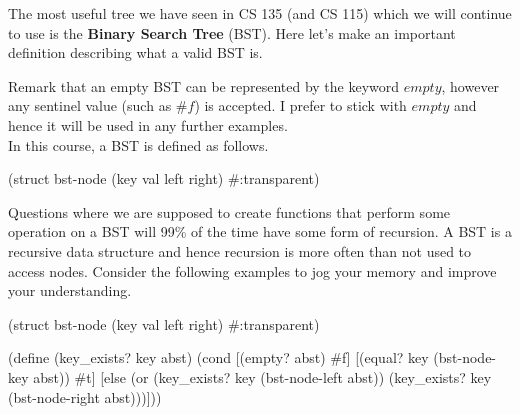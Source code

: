 
The most useful tree we have seen in CS 135 (and CS 115) which we will continue to use is the \textbf{Binary Search Tree} (BST). Here let's make an important definition describing what a valid BST is.\\


Remark that an empty BST can be represented by the keyword $empty$, however any sentinel value (such as $\#f$) is accepted. I prefer to stick with $empty$ and hence it will be used in any further examples.\\

In this course, a BST is defined as follows.\\

\begin{code}[Lisp]
(struct bst-node (key val left right) #:transparent)
\end{code}

Questions where we are supposed to create functions that perform some operation on a BST will 99\% of the time have some form of recursion. A BST is a recursive data structure and hence recursion is more often than not used to access nodes. Consider the following examples to jog your memory and improve your understanding.\\


\begin{code}[Lisp]
(struct bst-node (key val left right) #:transparent)

(define (key_exists? key abst)
	(cond
		[(empty? abst) #f]
		[(equal? key (bst-node-key abst)) #t]
		[else (or (key_exists? key (bst-node-left abst))
		          (key_exists? key (bst-node-right abst)))]))
\end{code}

